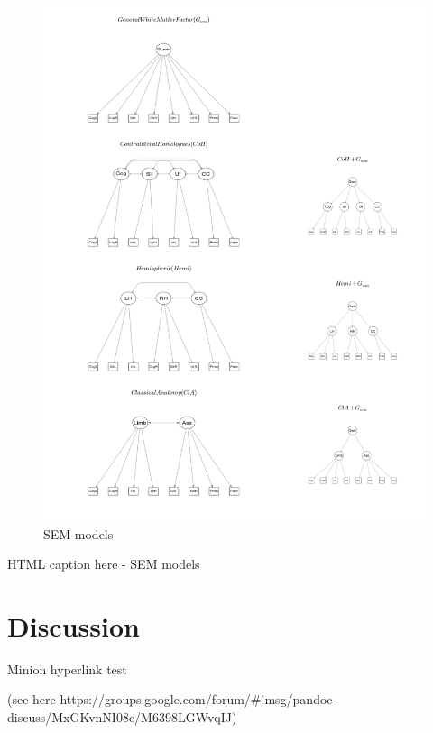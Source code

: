     \begin{figure}[htbp]
\centering
\includegraphics{figures/SEM_models.png}
\caption{SEM models \label{fig:SEM models}}
\end{figure}

HTML caption here - SEM models


    \section{Discussion}


    Minion hyperlink test

(see here
https://groups.google.com/forum/\#!msg/pandoc-discuss/MxGKvnNI08c/M6398LGWvqIJ)

